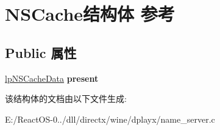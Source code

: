 \hypertarget{struct_n_s_cache}{}\section{N\+S\+Cache结构体 参考}
\label{struct_n_s_cache}
\subsection*{Public 属性}
\begin{DoxyCompactItemize}
\item 
\mbox{\label{struct_n_s_cache_a39848cc2207bbdfd9c5ac28850e45dd4}} 
\hyperlink{struct_n_s_cache_data}{lp\+N\+S\+Cache\+Data} {\bfseries present}
\end{DoxyCompactItemize}


该结构体的文档由以下文件生成\+:\begin{DoxyCompactItemize}
\item 
E\+:/\+React\+O\+S-\/0../dll/directx/wine/dplayx/name\+\_\+server.\+c\end{DoxyCompactItemize}
